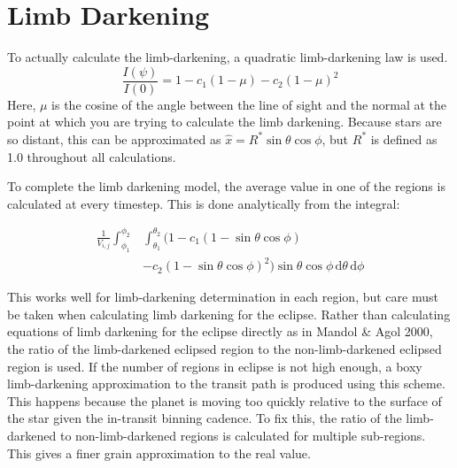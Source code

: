 









\section{Limb Darkening}
To actually calculate the limb-darkening, a quadratic limb-darkening law is used.
\begin{equation}
   \frac{I(\psi)}{I(0)} = 1 - c_1 (1 - \mu) - c_2 (1 - \mu)^2
\end{equation}
Here, $\mu$ is the cosine of the angle between the line of sight and the normal at the point at which you are trying to calculate the limb darkening. Because stars are so distant, this can be approximated as $\hat{x} = R^* \sin{\theta}\cos{\phi}$, but $R^{*}$ is defined as 1.0 throughout all calculations.

To complete the limb darkening model, the average value in one of the regions is calculated at every timestep. This is done analytically from the integral:

\begin{equation}
\begin{split}
    \frac{1}{V_{i,j}} \int_{\phi_1}^{\phi_2} & \int_{\theta_1}^{\theta_2}  (1 - c_1 (1 - \sin{\theta}\cos{\phi}) \\ &- c_2 (1 - \sin{\theta}\cos{\phi})^2) \sin{\theta}\cos{\phi}\,\mathrm{d}\theta \, \mathrm{d}\phi
\end{split}
\end{equation}

This works well for limb-darkening determination in each region, but care must be taken when calculating limb darkening for the eclipse. Rather than calculating equations of limb darkening for the eclipse directly as in Mandol \& Agol 2000, the ratio of the limb-darkened eclipsed region to the non-limb-darkened eclipsed region is used. If the number of regions in eclipse is not high enough, a boxy limb-darkening approximation to the transit path is produced using this scheme. This happens because the planet is moving too quickly relative to the surface of the star given the in-transit binning cadence. To fix this, the ratio of the limb-darkened to non-limb-darkened regions is calculated for multiple sub-regions. This gives a finer grain approximation to the real value.

